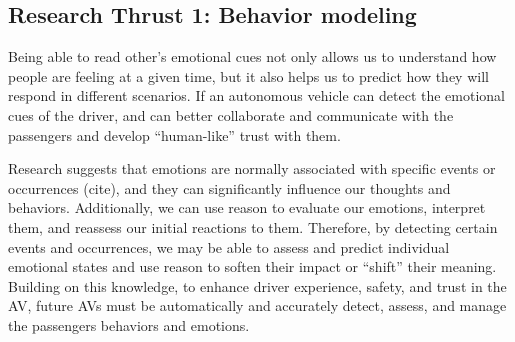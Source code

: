 \subsection{Research Thrust 1: Behavior modeling}
\label{sec:behaviour}

 Being able to read other’s emotional cues not only allows us to understand how people are feeling at a given time, but it also helps us to predict how they will respond in different scenarios. 
 If an autonomous vehicle can detect the emotional cues of the driver, and can better collaborate and communicate with the passengers and develop “human-like” trust with them. 
 
 
 Research suggests that emotions are normally associated with specific events or occurrences (cite), and they can significantly influence our thoughts and behaviors. 
 Additionally, we can use reason to evaluate our emotions, interpret them, and reassess our initial reactions to them. 
 Therefore, by detecting certain events and occurrences, we may be able to assess and predict individual emotional states and use reason to soften their impact or ``shift'' their meaning. 
 Building on this knowledge, to enhance driver experience, safety, and trust in the AV, future AVs must be automatically and accurately detect, assess, and manage the passengers behaviors and emotions. 
 
